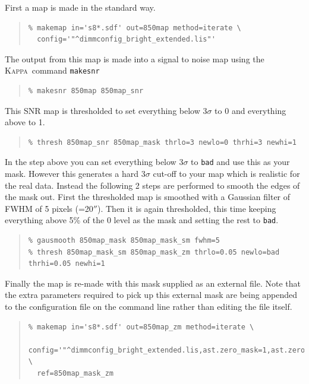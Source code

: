 \documentclass[twoside,11pt]{article}
\newcommand{\xref}[3]{#1}
\renewcommand{\_}{\texttt{\symbol{95}}}
\newenvironment{myquote}{\begin{quote}\begin{small}}{\end{small}\end{quote}}
\newcommand{\Kappa}{\xref{\textsc{Kappa}}{sun95}{}}
\begin{document}
First a map is made in the standard way.
\begin{myquote}
\begin{verbatim}
% makemap in='s8*.sdf' out=850map method=iterate \
  config='"^dimmconfig_bright_extended.lis"'
\end{verbatim}
\end{myquote}
The output from this map is made into a signal to noise map using the \Kappa\ command \texttt{makesnr}
\begin{myquote}
\begin{verbatim}
% makesnr 850map 850map_snr
\end{verbatim}
\end{myquote}
This SNR map is thresholded to set everything below 3$\sigma$ to 0 and everything above to 1.
\begin{myquote}
\begin{verbatim}
% thresh 850map_snr 850map_mask thrlo=3 newlo=0 thrhi=3 newhi=1
\end{verbatim}
\end{myquote}
In the step above you can set everything below 3$\sigma$ to \texttt{bad} and use this as your mask. However this generates a hard 3$\sigma$ cut-off to your map which is realistic for the real data. Instead the following 2 steps are performed to smooth the edges of the mask out. First the thresholded map is smoothed with a Gaussian filter of FWHM of 5 pixels (=20$''$). Then it is again thresholded, this time keeping everything above 5\% of the 0 level as the mask and setting the rest to \texttt{bad}.
 \begin{myquote}
\begin{verbatim}
% gausmooth 850map_mask 850map_mask_sm fwhm=5
% thresh 850map_mask_sm 850map_mask_zm thrlo=0.05 newlo=bad thrhi=0.05 newhi=1
\end{verbatim}
\end{myquote}
Finally the map is re-made with this mask supplied as an external file. Note that the extra parameters required to pick up this external mask are being appended to the configuration file on the command line rather than editing the file itself.
 \begin{myquote}
\begin{verbatim}
% makemap in='s8*.sdf' out=850map_zm method=iterate \
  config='"^dimmconfig_bright_extended.lis,ast.zero_mask=1,ast.zero_snr=0"' \
  ref=850map_mask_zm
\end{verbatim}
\end{myquote}
\end{document}
